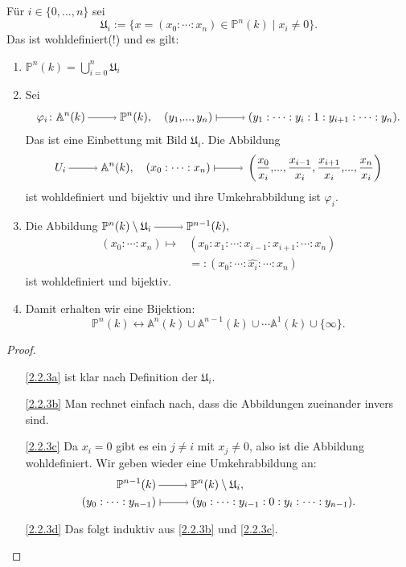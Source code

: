 \documentclass[a4paper,12pt,index=toc]{scrbook}
\theoremstyle{keinenummern} %
\def\A{\mathbb{A}}
\def\P{\mathbb{P}}
\def\U{\mathfrak{U}}
\renewcommand{\phi}{\varphi}
\renewcommand{\dotsc}{\ensuremath{\!...}}
\newcommand{\dach}{\widehat}
\begin{document}
\begin{db}\label{2.2.3}
Für $i\in\{0,\dotsc,n\}$ sei \[\U_{i}:=\{x=(x_{0}:\dotsm:x_{n})\in\P^{n}(k)\mid x_{i}\neq 0\}.\] Das ist wohldefiniert(!) und es gilt:
\begin{enumerate}
\item{} $\displaystyle\P^{n}(k)=\bigcup_{i=0}^{n}\U_{i}$
\item{} Sei
\[\phi_{i}\colon\A^{n}(k)\ra \P^{n}(k),\quad(y_{1},\dotsc,y_{n})\mapsto(y_{1}:\dotsm:y_{i}:1:y_{i+1}:\dotsm:y_{n}).\]
Das ist eine Einbettung mit Bild $\U_{i}$.
Die Abbildung
\[U_{i}\ra\A^{n}(k),\quad(x_{0}:\dotsm:x_{n})\mapsto\left(\frac{x_{0}}{x_{i}},\dotsc,\frac{x_{i-1}}{x_{i}},\frac{x_{i+1}}{x_{i}},\dotsc,\frac{x_{n}}{x_{i}}\right)\]
ist wohldefiniert und bijektiv und ihre Umkehrabbildung ist $\phi_{i}$.
\item{}
Die Abbildung $\P^{n}(k)\setminus \U_{i}\ra\P^{n-1}(k),$
\begin{align*}(x_{0}:\dotsm:x_{n})\mapsto&(x_{0}:x_{1}:\dotsm:x_{i-1}:x_{i+1}:\dotsm:x_{n})\\&=:(x_{0}:\dotsm:\dach{x_{i}}:\dotsm:x_{n})\end{align*}
ist wohldefiniert und bijektiv.
\item{} Damit erhalten wir eine Bijektion:
\[\P^{n}(k)\longleftrightarrow\A^{n}(k)\cup\A^{n-1}(k)\cup\dotsm\A^{1}(k)\cup\{\infty\}.\]
\end{enumerate}\end{db}
\begin{proof}\begin{enumerate}
\item[\ref{2.2.3a}] ist klar nach Definition der $\U_{i}$.
\item[\ref{2.2.3b}] Man rechnet einfach nach, dass die Abbildungen zueinander invers sind.
\item[\ref{2.2.3c}] Da $x_{i}=0$ gibt es ein $j\neq i$ mit $x_{j}\neq0$, also ist die Abbildung wohldefiniert. Wir geben wieder eine Umkehrabbildung an:
\begin{align*}\P^{n-1}(k)&\ra\P^{n}(k)\setminus \U_{i},\\(y_{0}:\dotsm:y_{n-1})&\mapsto(y_{0}:\dotsm:y_{i-1}:0:y_{i}:\dotsm:y_{n-1}).\end{align*}
\item[\ref{2.2.3d}] Das folgt induktiv aus \ref{2.2.3b} und \ref{2.2.3c}.
\end{enumerate}\end{proof}
\end{document}
